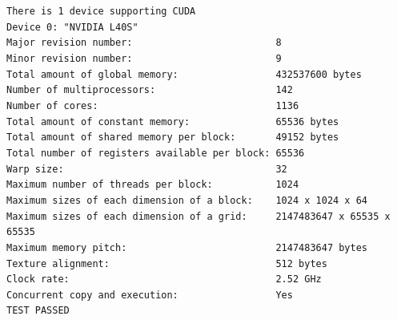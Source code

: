 \documentclass{article}
\begin{document}
	\verb!There is 1 device supporting CUDA! \\
	
	\noindent \verb!Device 0: "NVIDIA L40S"! \\
	\verb!Major revision number:                         8! \\
	\verb!Minor revision number:                         9! \\
	\verb!Total amount of global memory:                 432537600 bytes! \\
	\verb!Number of multiprocessors:                     142! \\
	\verb!Number of cores:                               1136! \\
	\verb!Total amount of constant memory:               65536 bytes! \\
	\verb!Total amount of shared memory per block:       49152 bytes! \\
	\verb!Total number of registers available per block: 65536! \\
	\verb!Warp size:                                     32! \\
	\verb!Maximum number of threads per block:           1024! \\
	\verb!Maximum sizes of each dimension of a block:    1024 x 1024 x 64! \\
	\verb!Maximum sizes of each dimension of a grid:     2147483647 x 65535 x 65535! \\
	\verb!Maximum memory pitch:                          2147483647 bytes! \\
	\verb!Texture alignment:                             512 bytes! \\
	\verb!Clock rate:                                    2.52 GHz! \\
	\verb!Concurrent copy and execution:                 Yes! \\
	
	\noindent \verb!TEST PASSED! \\
	
\end{document}
